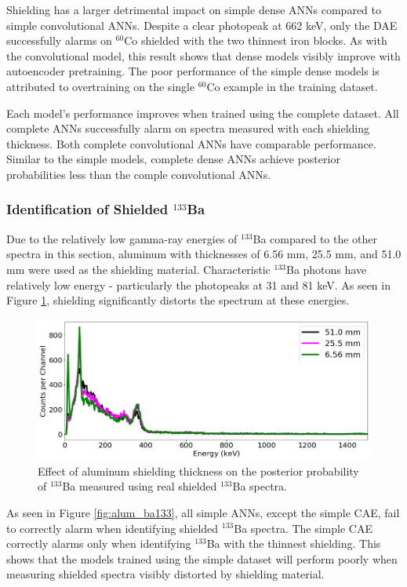 Shielding has a larger detrimental impact on simple dense ANNs compared to simple convolutional ANNs. Despite a clear photopeak at 662 keV, only the DAE successfully alarms on $^{60}$Co shielded with the two thinnest iron blocks. As with the convolutional model, this result shows that dense models visibly improve with autoencoder pretraining. The poor performance of the simple dense models is attributed to overtraining on the single $^{60}$Co example in the training dataset. 

Each model's performance improves when trained using the complete dataset. All complete ANNs successfully alarm on spectra measured with each shielding thickness. Both complete convolutional ANNs have comparable performance. Similar to the simple models, complete dense ANNs achieve posterior probabilities less than the comple convolutional ANNs.

\subsubsection{Identification of Shielded $^{133}$Ba}

Due to the relatively low gamma-ray energies of $^{133}$Ba compared to the other spectra in this section, aluminum with thicknesses of 6.56 mm, 25.5 mm, and 51.0 mm were used as the shielding material. Characteristic $^{133}$Ba photons have relatively low energy - particularly the photopeaks at 31 and 81 keV. As seen in Figure \ref{fig:shielded_ba133}, shielding significantly distorts the spectrum at these energies.

\begin{figure}[H]
	\centering
	\includegraphics[width=0.8\linewidth]{images/shielded_ba133}
	\caption{Effect of aluminum shielding thickness on the posterior probability of $^{133}$Ba measured using real shielded $^{133}$Ba spectra.}
	\label{fig:shielded_ba133}
\end{figure}

As seen in Figure \ref{fig:alum_ba133}, all simple ANNs, except the simple CAE, fail to correctly alarm when identifying shielded $^{133}$Ba spectra. The simple CAE correctly alarms only when identifying $^{133}$Ba with the thinnest shielding. This shows that the models trained using the simple dataset will perform poorly when measuring shielded spectra visibly distorted by shielding material.

